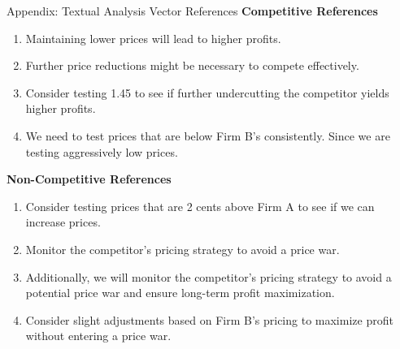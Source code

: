 \documentclass[10pt, aspectratio=169]{beamer}
\begin{document}
\begin{frame}{Appendix: Textual Analysis Vector References}\label{app:textual_comp_score}
\textbf{Competitive References}
\begin{enumerate}
    \item Maintaining lower prices will lead to higher profits.
    \item Further price reductions might be necessary to compete effectively.
    \item Consider testing 1.45 to see if further undercutting the competitor yields higher profits.
    \item We need to test prices that are below Firm B's consistently. Since we are testing aggressively low prices.
\end{enumerate}

\textbf{Non-Competitive References}
\begin{enumerate}
    \item Consider testing prices that are 2 cents above Firm A to see if we can increase prices.
    \item Monitor the competitor's pricing strategy to avoid a price war.
    \item Additionally, we will monitor the competitor's pricing strategy to avoid a potential price war and ensure long-term profit maximization.
    \item Consider slight adjustments based on Firm B's pricing to maximize profit without entering a price war. \hyperlink{slide:comp_score}{}
\end{enumerate}

\end{frame}



\end{document}
